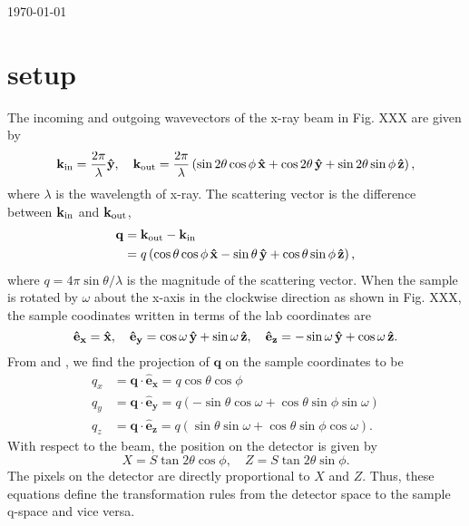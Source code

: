 \documentclass[12pt,letterpaper]{article}
\begin{document}
\today

\section{setup}
The incoming and outgoing wavevectors of the x-ray beam in Fig. XXX 
are given by
\begin{equation}
  \mathbf{k}_{\mathrm{in}} = \frac{2\pi}{\lambda} \mathbf{\hat{y}}, \quad
  \mathbf{k}_{\mathrm{out}} = 
    \frac{2\pi}{\lambda} \left( 
      \sin 2\theta \cos\phi \, \mathbf{\hat{x}}
      + \cos 2\theta \, \mathbf{\hat{y}}
      + \sin 2\theta \sin\phi \, \mathbf{\hat{z}} 
    \right),
  \label{eq:kinkout}
\end{equation}
where $\lambda$ is the wavelength of x-ray. The scattering vector is
the difference between $\mathbf{k}_{\mathrm{in}}$ and $\mathbf{k}_{\mathrm{out}}$,
\begin{align}
  \mathbf{q} &= \mathbf{k}_{\mathrm{out}} - \mathbf{k}_{\mathrm{in}} \nonumber \\
             &= q \left( 
                  \cos\theta\cos\phi \, \mathbf{\hat{x}} - \sin\theta \, \mathbf{\hat{y}}
                  + \cos\theta\sin\phi \, \mathbf{\hat{z}}
                \right),
  \label{eq:q_vector}
\end{align}
where $q=4\pi\sin\theta/\lambda$ is the magnitude of the scattering vector. 
When the sample is rotated by $\omega$ about the x-axis in the clockwise 
direction as shown in Fig. XXX, the sample coodinates written in terms of 
the lab coordinates are  
\begin{equation}
  \mathbf{\hat{e}_x} = \mathbf{\hat{x}}, \quad
  \mathbf{\hat{e}_y} = \cos\omega\,\mathbf{\hat{y}} + \sin\omega\,\mathbf{\hat{z}}, \quad
  \mathbf{\hat{e}_z} = -\sin\omega\,\mathbf{\hat{y}} + \cos\omega\,\mathbf{\hat{z}}.
  \label{eq:smp_coord}
\end{equation}
From  and , we find the projection of 
$\mathbf{q}$ on the sample coordinates to be
\begin{align}
  q_x &= \mathbf{q}\cdot\mathbf{\hat{e}_x} 
       = q\cos\theta\cos\phi 
       \label{eq:qx} \\
  q_y &= \mathbf{q}\cdot\mathbf{\hat{e}_y} 
       = q\left(-\sin\theta\cos\omega + \cos\theta\sin\phi\sin\omega\right) 
       \label{eq:qy} \\
  q_z &= \mathbf{q}\cdot\mathbf{\hat{e}_z} 
       = q\left(\sin\theta\sin\omega + \cos\theta\sin\phi\cos\omega\right).
       \label{eq:qz}
\end{align}
With respect to the beam, the position on the detector is given by
\begin{equation}
  X = S \tan 2\theta \cos\phi, \quad Z = S \tan 2\theta \sin\phi.
\end{equation} 
The pixels on the detector are directly proportional to $X$ and $Z$. Thus,
these equations define the transformation rules from the detector space
to the sample q-space and vice versa.
\end{document}
